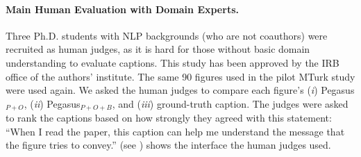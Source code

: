 \paragraph{Main Human Evaluation with Domain Experts.}
Three Ph.D. students with NLP backgrounds (who are not coauthors) were recruited as human judges, 
as it is hard for those without basic domain understanding to evaluate captions.
This study has been approved by the IRB office of the authors' institute.
The same 90 figures used in the pilot MTurk study were used again.
We asked the human judges to compare each figure's 
(\textit{i}) Pegasus$_{P+O}$, (\textit{ii}) Pegasus$_{P+O+B}$, and (\textit{iii}) ground-truth caption. 
The judges were asked to rank the captions based on how strongly they agreed with this statement:
``When I read the paper, this caption can help me understand the message that the figure tries to convey.'' 
 (see ) shows the interface the human judges used. %

